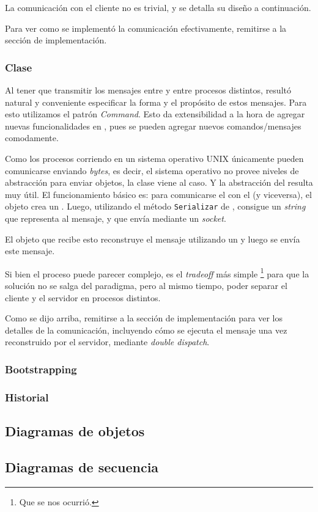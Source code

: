           La comunicaci\'on con el cliente no es trivial, y se detalla su dise\~no a
          continuaci\'on.

          Para ver como se implement\'o la comunicaci\'on efectivamente, remitirse
          a la secci\'on de implementaci\'on.
          
      \subsubsection{Clase \mensaje{}}
          Al tener que transmitir los mensajes entre \cliente{} y \servidor{} entre
          procesos distintos, result\'o natural y conveniente especificar la forma
          y el prop\'osito de estos mensajes.
          Para esto utilizamos el patr\'on \textit{Command}. Esto da extensibilidad
          a la hora de agregar nuevas funcionalidades en \servidor{}, pues se pueden
          agregar nuevos comandos/mensajes comodamente.

          Como los procesos corriendo en un sistema operativo \textsc{UNIX} \'unicamente
          pueden comunicarse enviando \textit{bytes}, es decir, el sistema operativo no
          provee niveles de abstracci\'on para enviar objetos, la clase
          \constructorMensaje{} viene al caso. Y la abstracci\'on del \mensaje{}
          resulta muy \'util.
          El funcionamiento b\'asico es: para comunicarse el \cliente{} con el \servidor{}
          (y viceversa), el objeto crea un \mensaje{}.
          Luego, utilizando el m\'etodo \texttt{Serializar} de \mensaje{}, consigue un
          \textit{string} que representa al mensaje, y que env\'ia mediante un \textit{socket}.

          El objeto que recibe esto reconstruye el mensaje utilizando un \constructorMensaje{}
          y luego se env\'ia este mensaje.

          Si bien el proceso puede parecer complejo, es el \textit{tradeoff} m\'as simple
          \footnote{Que se nos ocurri\'o.} para que la soluci\'on no se salga del paradigma,
          pero al mismo tiempo, poder separar el cliente y el servidor en procesos distintos.

          Como se dijo arriba, remitirse a la secci\'on de implementaci\'on para ver
          los detalles de la comunicaci\'on, incluyendo c\'omo se ejecuta el mensaje
          una vez reconstruido por el servidor, mediante \textit{double dispatch}.

      \subsubsection{Bootstrapping}

      \subsubsection{Historial}

  \subsection{Diagramas de objetos}

  \subsection{Diagramas de secuencia}
